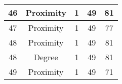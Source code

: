 \documentclass[results.tex]{subfiles}
\begin{document}
\begin{center}
\begin{tabular}{| c || c | c | c | c |}
            \hline
            46                      & Proximity                    & 1                      & 49                      & 81                   \\
            \hline
            47                      & Proximity                    & 1                      & 49                      & 77                   \\
            \hline
            48                      & Proximity                    & 1                      & 49                      & 81                   \\
            \hline
            48                      & Degree                       & 1                      & 49                      & 81                   \\
            \hline
            49                      & Proximity                    & 1                      & 49                      & 71                   \\
            \hline
        \end{tabular}
    \end{center}
\end{document}
